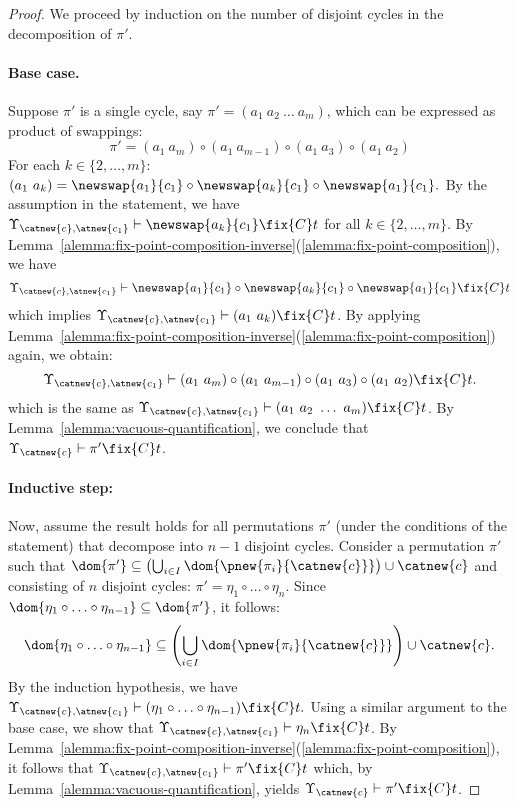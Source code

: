 \begin{proof}
    We proceed by induction on the number of disjoint cycles in the decomposition of $\pi'$.

    \paragraph*{Base case.}

    Suppose $\pi'$ is a single cycle, say $\pi' = (a_1 \ a_2 \ \ldots \ a_m)$, which can be expressed as product of swappings:
     \[
        \pi' = (a_1 \ a_m)\circ (a_1 \ a_{m-1})\circ(a_1 \ a_3)\circ(a_1 \ a_2)
    \]
    For each $k\in\{2, \ldots, m\}$: $(a_1 \ a_k) = \newswap{a_1}{c_1}\circ \newswap{a_k}{c_1} \circ \newswap{a_1}{c_1}.$ By the assumption in the statement, we have $\Upsilon_{\catnew{c},\atnew{c_1}} \vdash \newswap{a_k}{c_1}\fix{C} t$ for all $k\in \{2, \ldots, m\}$. By Lemma~\ref{alemma:fix-point-composition-inverse}(\ref{alemma:fix-point-composition}), we have
    \[
        \Upsilon_{\catnew{c},\atnew{c_1}} \vdash \newswap{a_1}{c_1}\circ \newswap{a_k}{c_1} \circ \newswap{a_1}{c_1}\fix{C} t
    \]
    which implies $\Upsilon_{\catnew{c},\atnew{c_1}} \vdash (a_1 \ a_k)\fix{C} t$. By applying Lemma~\ref{alemma:fix-point-composition-inverse}(\ref{alemma:fix-point-composition}) again, we obtain:
    \[
        \Upsilon_{\catnew{c},\atnew{c_1}} \vdash (a_1 \ a_m)\circ (a_1 \ a_{m-1})\circ(a_1 \ a_3)\circ(a_1 \ a_2)\fix{C} t.
    \]
    which is the same as $\Upsilon_{\catnew{c},\atnew{c_1}} \vdash (a_1 \ a_2 \ \ldots \ a_m)\fix{C} t$. By Lemma~\ref{alemma:vacuous-quantification}, we conclude that $\Upsilon_{\catnew{c}} \vdash \pi'\fix{C} t$.

    \paragraph*{Inductive step:} Now, assume the result holds for all permutations $\pi'$ (under the conditions of the statement) that decompose into $n-1$ disjoint cycles. Consider a permutation $\pi'$ such that $\dom{\pi'} \subseteq \left(\bigcup_{i \in I} \dom{\pnew{\pi_i}{\catnew{c}}}\right) \cup \catnew{c}$ and consisting of $n$ disjoint cycles: $\pi' = \eta_1\circ\ldots\circ\eta_n.$ Since $\dom{\eta_1 \circ \ldots \circ \eta_{n-1}} \subseteq \dom{\pi'}$, it follows:
    \[
        \dom{\eta_1\circ\ldots\circ\eta_{n-1}} \subseteq \left(\bigcup_{i\in I}\dom{\pnew{\pi_i}{\catnew{c}}}\right)\cup\catnew{c}.
    \]
    By the induction hypothesis, we have $\Upsilon_{\catnew{c},\atnew{c_1}} \vdash (\eta_1\circ\ldots\circ\eta_{n-1})\fix{C} t.$ Using a similar argument to the base case, we show that $\Upsilon_{\catnew{c},\atnew{c_1}} \vdash \eta_n\fix{C} t$. By  Lemma~\ref{alemma:fix-point-composition-inverse}(\ref{alemma:fix-point-composition}), it follows that $\Upsilon_{\catnew{c},\atnew{c_1}} \vdash \pi'\fix{C} t$ which, by Lemma~\ref{alemma:vacuous-quantification}, yields $\Upsilon_{\catnew{c}} \vdash \pi'\fix{C} t$.
\end{proof}

